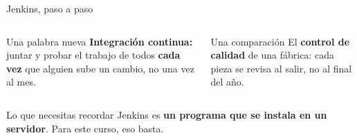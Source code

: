 \documentclass[aspectratio=169,10pt,c]{beamer}
\begin{document}
\begin{frame}{Jenkins, paso a paso}
\begin{center}
\end{center}
\begin{columns}[T,onlytextwidth]
\begin{block}{Una palabra nueva}
\small \textbf{Integración continua:} juntar y probar el trabajo de todos \textbf{cada vez} que alguien sube un cambio, no una vez al mes.
\end{block}
\begin{exampleblock}{Una comparación}
\small El \textbf{control de calidad} de una fábrica: cada pieza se revisa al salir, no al final del año.
\end{exampleblock}
\end{columns}
\par\vspace{1mm}
\begin{alertblock}{Lo que necesitas recordar}
\small Jenkins es \textbf{un programa que se instala en un servidor}. Para este curso, eso basta.
\end{alertblock}
\end{frame}
\end{document}
